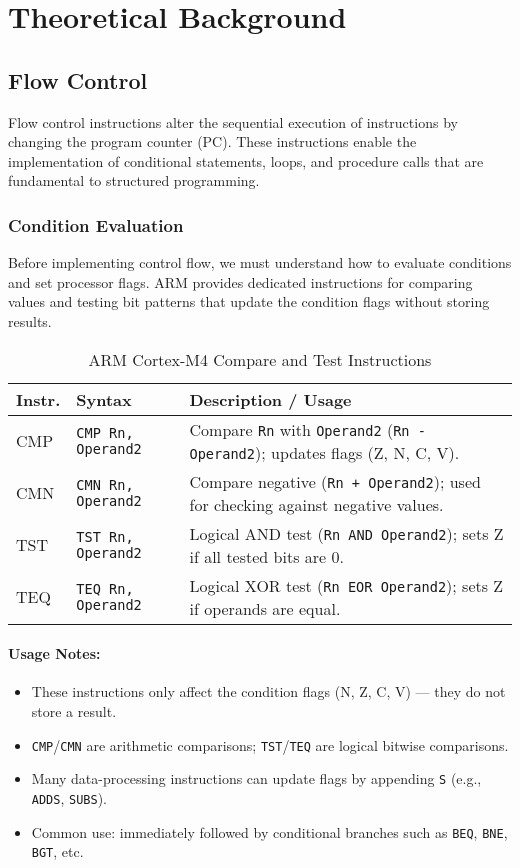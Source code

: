 \newpage
{}
\localtableofcontents
\bigskip
\newpage
\section{Theoretical Background}
\subsection{Flow Control}
Flow control instructions alter the sequential execution of instructions by changing the program counter (PC). These instructions enable the implementation of conditional statements, loops, and procedure calls that are fundamental to structured programming.

\subsubsection{Condition Evaluation}
Before implementing control flow, we must understand how to evaluate conditions and set processor flags. ARM provides dedicated instructions for comparing values and testing bit patterns that update the condition flags without storing results.

\begin{table}[H]
\centering
\caption{ARM Cortex-M4 Compare and Test Instructions}
\small
\begin{tabularx}{\linewidth}{@{}l l X@{}}
\toprule
\textbf{Instr.} & \textbf{Syntax} & \textbf{Description / Usage} \\
\midrule
CMP     & \texttt{CMP Rn, Operand2}   & Compare \texttt{Rn} with \texttt{Operand2} (\texttt{Rn - Operand2}); updates flags (Z, N, C, V). \\
CMN     & \texttt{CMN Rn, Operand2}   & Compare negative (\texttt{Rn + Operand2}); used for checking against negative values. \\
TST     & \texttt{TST Rn, Operand2}   & Logical AND test (\texttt{Rn AND Operand2}); sets Z if all tested bits are 0. \\
TEQ     & \texttt{TEQ Rn, Operand2}   & Logical XOR test (\texttt{Rn EOR Operand2}); sets Z if operands are equal. \\
\bottomrule
\end{tabularx}
\end{table}

\paragraph{Usage Notes:}
\begin{itemize}[nosep]
  \item These instructions only affect the condition flags (N, Z, C, V) — they do not store a result.
  \item \texttt{CMP}/\texttt{CMN} are arithmetic comparisons; \texttt{TST}/\texttt{TEQ} are logical bitwise comparisons.
  \item Many data-processing instructions can update flags by appending \texttt{S} (e.g., \texttt{ADDS}, \texttt{SUBS}).
  \item Common use: immediately followed by conditional branches such as \texttt{BEQ}, \texttt{BNE}, \texttt{BGT}, etc.
\end{itemize}

